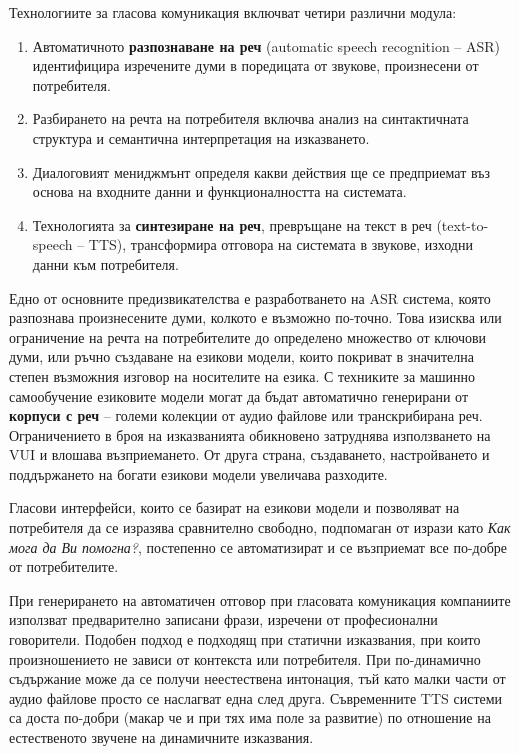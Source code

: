 \begin{multicols}{2}
  Технологиите за гласова комуникация включват четири различни модула:

  \begin{enumerate}
  \item Автоматичното \textbf{разпознаване на реч}  (automatic speech recognition -- ASR)  идентифицира изречените думи в поредицата от звукове, произнесени от потребителя.
  \item Разбирането на речта на потребителя включва анализ на синтактичната структура и семантична интерпретация  на изказването.
  \item Диалоговият мениджмънт определя какви действия ще се предприемат въз основа на входните данни и функционалността на системата.
  \item Технологията за \textbf{синтезиране на реч}, превръщане на текст в
   реч (text-to-speech -- TTS), трансформира отговора на системата в
   звукове, изходни данни към потребителя.
  \end{enumerate}

  Едно от основните предизвикателства е разработването на ASR система, която разпознава произнесените думи, колкото е възможно по-точно. Това изисква или
   ограничение на речта на потребителите до определено множество от ключови думи, или ръчно създаване на езикови модели, които покриват
  в значителна степен възможния изговор на носителите на езика.
  С техниките за машинно самообучение езиковите модели могат да бъдат автоматично генерирани от \textbf{корпуси с реч} -- големи колекции от аудио файлове или транскрибирана реч.
  Ограничението в броя на изказванията обикновено затруднява  използването на VUI  и влошава възприемането. От друга страна, създаването, настройването и поддържането на богати  езикови модели увеличава разходите.

  Гласови интерфейси, които се базират на езикови модели и позволяват на потребителя да се изразява сравнително свободно, подпомаган от изрази като \textit{Как мога да Ви помогна?}, постепенно се автоматизират и се възприемат все по-добре от потребителите.


  При генерирането на автоматичен отговор при гласовата комуникация компаниите използват предварително записани фрази, изречени от професионални говорители. Подобен подход е подходящ при статични изказвания, при които произношението не зависи от контекста или потребителя. При по-динамично съдържание може да се получи неестествена интонация, тъй като  малки части от аудио файлове просто се наслагват една след друга. Съвременните TTS системи са доста по-добри (макар че и при тях  има поле за развитие) по отношение на естественото звучене 
   на динамичните изказвания.


\end{multicols}

